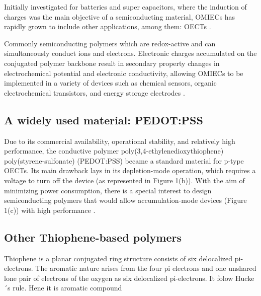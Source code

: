 Initially investigated for batteries and super capacitors, where the induction of charges was the main objective of a semiconducting material, OMIECs has rapidly grown to include other applications, among them: OECTs \cite{paulsenOrganicMixedIonic2020}.


Commonly semiconducting polymers which are redox-active and can simultaneously conduct ions and electrons. Electronic charges accumulated on the conjugated polymer backbone result in secondary property changes in electrochemical potential and electronic conductivity, allowing OMIECs to be implemented in a variety of devices such as chemical sensors, organic electrochemical transistors, and energy storage electrodes \cite{tanOrganicMixedIonic2022}.

\subsection{A widely used material: PEDOT:PSS}
Due to its commercial availability, operational stability, and relatively high performance, the conductive polymer poly(3,4-ethylenedioxythiophene) poly(styrene-sulfonate) (PEDOT:PSS) became a standard material for p-type OECTs. Its main drawback lays in its depletion-mode operation, which requires a voltage to turn off the device (as represented in Figure 1(b)). With the aim of minimizing power consumption, there is a special interest to design semiconducting polymers that would allow accumulation-mode devices (Figure 1(c)) with high performance \cite{nielsenMolecularDesignSemiconducting2016} \cite{tanOrganicMixedIonic2022}.

\subsection{Other Thiophene-based polymers}
Thiophene is a planar conjugated ring structure consists of six delocalized pi-electrons. The aromatic nature arises from the four pi electrons and one unshared lone pair of electrons of the oxygen as six delocalized pi-electrons. It folow Hucke´s rule. Hene it is aromatic compound

